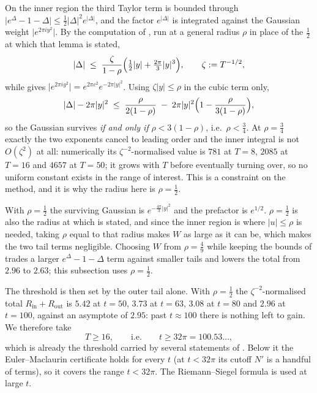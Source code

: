 \begin{remark}
\label{rem:rsf_radius}
On the inner region the third Taylor term is bounded through
$\lvert e^{\Delta}-1-\Delta\rvert\le\tfrac12\lvert\Delta\rvert^{2}e^{\lvert\Delta\rvert}$, and
the factor $e^{\lvert\Delta\rvert}$ is integrated against the Gaussian weight
$\lvert e^{2\pi iy^{2}}\rvert$.  By the computation of , run at a general radius $\rho$ in
place of the $\tfrac12$ at which that lemma is stated,
\[
  \lvert\Delta\rvert\;\le\;\frac{\zeta}{1-\rho}
     \Bigl(\tfrac12\lvert y\rvert+\tfrac{2\pi}3\lvert y\rvert^{3}\Bigr),
  \qquad\zeta:=T^{-1/2},
\]
while  gives $\lvert e^{2\pi iy^{2}}\rvert
=e^{2\pi c^{2}}e^{-2\pi\lvert y\rvert^{2}}$.  Using $\zeta\lvert y\rvert\le\rho$ in the cubic
term only,
\[
  \lvert\Delta\rvert-2\pi\lvert y\rvert^{2}
  \;\le\;\frac{\rho}{2(1-\rho)}
     \;-\;2\pi\lvert y\rvert^{2}\Bigl(1-\frac{\rho}{3(1-\rho)}\Bigr),
\]
so the Gaussian survives \emph{if and only if} $\rho<3(1-\rho)$, i.e.\ $\rho<\tfrac34$.  At
$\rho=\tfrac34$ exactly the two exponents cancel to leading order and the inner integral is not
$O(\zeta^{2})$ at all: numerically its $\zeta^{-2}$-normalised value is $781$ at $T=8$, $2085$ at
$T=16$ and $4657$ at $T=50$; it grows with $T$ before eventually turning over, so no uniform
constant exists in the range of interest.  This is a constraint on the method, and it is why
the radius here is $\rho=\tfrac12$.
\end{remark}

With $\rho=\tfrac12$ the surviving Gaussian is $e^{-\frac{4\pi}3\lvert y\rvert^{2}}$ and the
prefactor is $e^{1/2}$.  $\rho=\tfrac12$ is also the radius at which
 is stated, and since the inner region is where
$\lvert u\rvert\le\rho$ is needed, taking $\rho$ equal to that radius makes $W$ as large as it
can be, which makes the two tail terms negligible.  Choosing $W$ from $\rho=\tfrac49$ while
keeping the bounds of  trades a larger $e^{\Delta}-1-\Delta$
term against smaller tails and lowers the total from $2.96$ to $2.63$; this subsection uses
$\rho=\tfrac12$.

The threshold is then set by the outer tail alone.  With
$\rho=\tfrac12$ the $\zeta^{-2}$-normalised total $R_{\mathrm{in}}+R_{\mathrm{out}}$ is
$5.42$ at $t=50$, $3.73$ at $t=63$, $3.08$ at $t=80$ and $2.96$ at $t=100$, against an asymptote
of $2.95$: past $t\approx100$ there is nothing left to gain.  We therefore take
\[
  T\ge16,\qquad\text{i.e.}\qquad t\ge32\pi=100.53\ldots,
\]
which is already the threshold carried by several statements of .  Below it the
Euler--Maclaurin certificate  holds for every $t$ (at $t<32\pi$ its
cutoff $N'$ is a handful of terms), so it covers the range $t<32\pi$.  The Riemann--Siegel
formula is used at large $t$.

